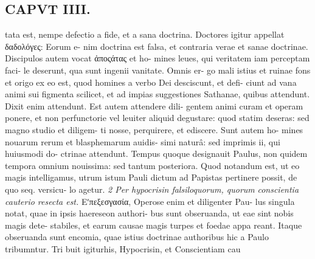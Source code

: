 \documentclass{article}
\begin{document}
\begin{pages}
\section*{CAPVT  IIII. }
\marginpar{[ p.185 ]}tata est, nempe defectio a fide, et a sana doctrina. Doctores igitur appellat δαδολόγες: Eorum e- nim doctrina est falsa, et contraria verae et sanae doctrinae. Discipulos autem vocat ἀποςάτας et ho- mines leues, qui veritatem iam perceptam faci- le deserunt, qua sunt ingenii vanitate. Omnis er- go mali istius et ruinae fons et origo ex eo est, quod homines a verbo Dei desciscunt, et defi- ciunt ad vana animi sui figmenta scilicet, et ad impias suggestiones Sathanae, quibus attendunt. Dixit enim attendunt. Est autem attendere dili- gentem animi curam et operam ponere, et non perfunctorie vel leuiter aliquid degustare: quod statim deseras: sed magno studio et diligem- ti nosse, perquirere, et ediscere. Sunt autem ho- mines nouarum rerum et blasphemarum auidis- simi naturâ: sed imprimis ii, qui huiusmodi do- ctrinae attendunt. Tempus quoque designauit Paulus, non quidem tempora omnium nouissima: sed tantum posteriora. Quod notandum est, ut eo magis intelligamus, utrum istum Pauli dictum ad Papistas pertinere possit, de quo seq. versicu- lo agetur. \textit{2 Per hypocrisin falsiloquorum, quorum} \textit{conscientia cauterio resecta est.} Εʹπεξεσγασία, Operose enim et diligenter Pau- lus singula notat, quae in ipsis haereseon authori- bus sunt obseruanda, ut eae sint nobis magis dete- stabiles, et earum causae magis turpes et foedae appa reant. Itaque obseruanda sunt encomia, quae istius doctrinae authoribus hic a Paulo tribumntur. Tri buit igiturhis, Hypocrisin, et Conscientiam cau 

\end{pages}
\end{document}
